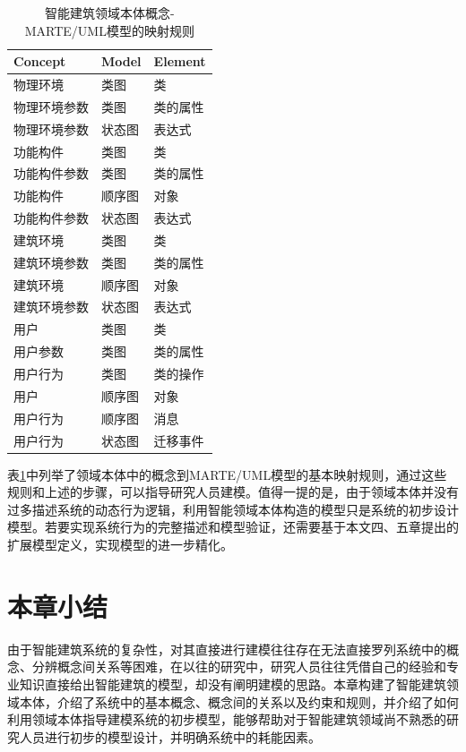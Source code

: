 	\begin{table}[!t]
	\scriptsize
	\renewcommand{\arraystretch}{1.4}
	\caption{智能建筑领域本体概念-MARTE/UML模型的映射规则}
	\label{ontology2uml}
	\centering
	\begin{tabular}{p{4cm}p{4cm}p{4cm}}
	\hline
	Concept & Model & Element \\
	\hline
	物理环境 & 类图 & 类 \\
	物理环境参数 & 类图 & 类的属性 \\
	物理环境参数 & 状态图 & 表达式 \\
	功能构件 & 类图 & 类 \\
	功能构件参数 & 类图 & 类的属性 \\
	功能构件 & 顺序图 & 对象 \\
	功能构件参数 & 状态图 & 表达式 \\
	建筑环境 & 类图 & 类 \\
	建筑环境参数 & 类图 & 类的属性 \\
	建筑环境 & 顺序图 & 对象 \\
	建筑环境参数 & 状态图 & 表达式 \\
	用户 & 类图 & 类 \\
	用户参数 & 类图 & 类的属性 \\
	用户行为 & 类图 & 类的操作 \\
	用户 & 顺序图 & 对象 \\
	用户行为 & 顺序图 & 消息 \\
	用户行为 & 状态图 & 迁移事件 \\
	\hline
	\end{tabular}
	\end{table}
	
	表\ref{ontology2uml}中列举了领域本体中的概念到MARTE/UML模型的基本映射规则，通过这些规则和上述的步骤，可以指导研究人员建模。值得一提的是，由于领域本体并没有过多描述系统的动态行为逻辑，利用智能领域本体构造的模型只是系统的初步设计模型。若要实现系统行为的完整描述和模型验证，还需要基于本文四、五章提出的扩展模型定义，实现模型的进一步精化。
	
\section{本章小结}
	由于智能建筑系统的复杂性，对其直接进行建模往往存在无法直接罗列系统中的概念、分辨概念间关系等困难，在以往的研究中，研究人员往往凭借自己的经验和专业知识直接给出智能建筑的模型，却没有阐明建模的思路。本章构建了智能建筑领域本体，介绍了系统中的基本概念、概念间的关系以及约束和规则，并介绍了如何利用领域本体指导建模系统的初步模型，能够帮助对于智能建筑领域尚不熟悉的研究人员进行初步的模型设计，并明确系统中的耗能因素。


